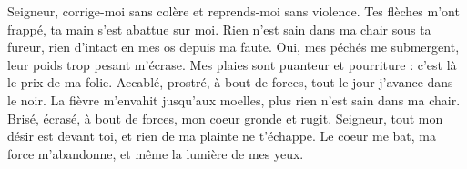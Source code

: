 Seigneur, corrige-moi sans colère et reprends-moi sans violence.
\versseparator
Tes flèches m'ont frappé, ta main s'est abattue sur moi.
\versseparator
Rien n'est sain dans ma chair sous ta fureur, rien d'intact en mes os depuis ma faute.
\versseparator
Oui, mes péchés me submergent, leur poids trop pesant m'écrase.
\versseparator
Mes plaies sont puanteur et pourriture : c'est là le prix de ma folie.
\versseparator
Accablé, prostré, à bout de forces, tout le jour j'avance dans le noir.
\versseparator
La fièvre m'envahit jusqu'aux moelles, plus rien n'est sain dans ma chair.
\versseparator
Brisé, écrasé, à bout de forces, mon coeur gronde et rugit.
\versseparator
Seigneur, tout mon désir est devant toi, et rien de ma plainte ne t'échappe.
\versseparator
Le coeur me bat, ma force m'abandonne, et même la lumière de mes yeux.
